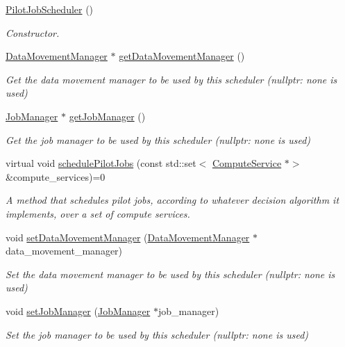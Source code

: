 \begin{DoxyCompactItemize}
\item 
\mbox{\label{classwrench_1_1_pilot_job_scheduler_ab230034aa98439169dc78bcf82bfced8}} 
\hyperlink{classwrench_1_1_pilot_job_scheduler_ab230034aa98439169dc78bcf82bfced8}{Pilot\+Job\+Scheduler} ()
\begin{DoxyCompactList}\small\item\em Constructor. \end{DoxyCompactList}\item 
\hyperlink{classwrench_1_1_data_movement_manager}{Data\+Movement\+Manager} $\ast$ \hyperlink{classwrench_1_1_pilot_job_scheduler_ab161a17fd3c1a7f5af171f813e32f3a1}{get\+Data\+Movement\+Manager} ()
\begin{DoxyCompactList}\small\item\em Get the data movement manager to be used by this scheduler (nullptr\+: none is used) \end{DoxyCompactList}\item 
\hyperlink{classwrench_1_1_job_manager}{Job\+Manager} $\ast$ \hyperlink{classwrench_1_1_pilot_job_scheduler_acd33b44c3481d911489626dc3f0ea957}{get\+Job\+Manager} ()
\begin{DoxyCompactList}\small\item\em Get the job manager to be used by this scheduler (nullptr\+: none is used) \end{DoxyCompactList}\item 
virtual void \hyperlink{classwrench_1_1_pilot_job_scheduler_a903c44145dfce2964f90cc856146adbb}{schedule\+Pilot\+Jobs} (const std\+::set$<$ \hyperlink{classwrench_1_1_compute_service}{Compute\+Service} $\ast$$>$ \&compute\+\_\+services)=0
\begin{DoxyCompactList}\small\item\em A method that schedules pilot jobs, according to whatever decision algorithm it implements, over a set of compute services. \end{DoxyCompactList}\item 
void \hyperlink{classwrench_1_1_pilot_job_scheduler_a8b981e431951cd683c2ec404ac970d2c}{set\+Data\+Movement\+Manager} (\hyperlink{classwrench_1_1_data_movement_manager}{Data\+Movement\+Manager} $\ast$data\+\_\+movement\+\_\+manager)
\begin{DoxyCompactList}\small\item\em Set the data movement manager to be used by this scheduler (nullptr\+: none is used) \end{DoxyCompactList}\item 
void \hyperlink{classwrench_1_1_pilot_job_scheduler_a8cc037ea3265c7d774fd61b05fa32142}{set\+Job\+Manager} (\hyperlink{classwrench_1_1_job_manager}{Job\+Manager} $\ast$job\+\_\+manager)
\begin{DoxyCompactList}\small\item\em Set the job manager to be used by this scheduler (nullptr\+: none is used) \end{DoxyCompactList}\end{DoxyCompactItemize}


